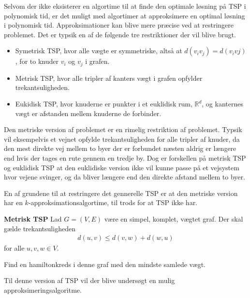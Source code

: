 Selvom der ikke eksisterer en algortime til at finde den optimale løsning på TSP i polynomisk tid, er det muligt med algortimer at approksimere en optimal løsning i polynomisk tid. Approksimationer kan blive mere præcise ved at restringere problemet.
Det er typsik en af de følgende tre restriktioner der vil blive brugt. 
\begin{itemize}[noitemsep]
	\item Symetrisk TSP, hvor alle vægte er symmetriske, altså at $d(v_i v_j) = d(v_i vj)$, for to knuder $v_i$ og $v_j$ i grafen.
	\item Metrisk TSP, hvor alle tripler af kanters vægt i grafen opfylder trekantsuligheden.
	\item Eukidisk TSP, hvor knuderne er punkter i et euklidisk rum, ${\mathbb{R}}^d$, og kanternes vægt er afstanden mellem knuderne de forbinder.
\end{itemize}

Den metriske version af problemet er en rimelig restriktion af problemet.
Typsik vil eksempelvis et vejnet opfylde trekantsuligheden for alle tripler af knuder, da den mest direkte vej mellem to byer der er forbundet næsten aldrig er længere end hvis der tages en rute gennem en tredje by.
Dog er forskellen på metrisk TSP og euklidisk TSP at den euklidiske version ikke vil kunne passe på et vejsystem hvor vejene svinger, og da bliver længere end den direkte afstand mellem to byer.

En af grundene til at restringere det gennerelle TSP er at den metriske version har en $k$-approksimationsalgortime, til trods for at TSP ikke har.

\begin{tcolorbox}
	\textbf{Metrisk TSP} \quad Lad $G=(V,E)$ være en simpel, komplet, vægtet graf. Der skal gælde trekantsuligheden
	\begin{align*}
		d(u,v) \leq d(v,w) + d(w,u)
	\end{align*}
	for alle $u,v,w \in V$.

	Find en hamiltonkreds i denne graf med den mindste samlede vægt.
\end{tcolorbox}

Til denne version af TSP vil der blive undersøgt en mulig approksimeringsalgoritme.
